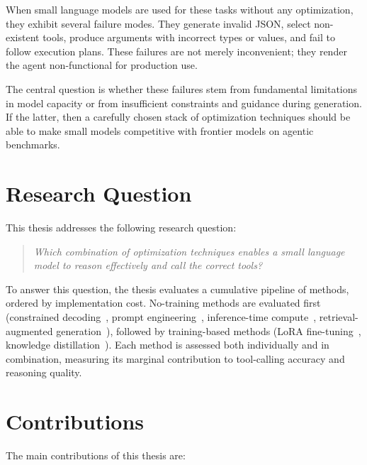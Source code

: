 When small language models are used for these tasks without any optimization, they exhibit several failure modes. They generate invalid JSON, select non-existent tools, produce arguments with incorrect types or values, and fail to follow execution plans. These failures are not merely inconvenient; they render the agent non-functional for production use.

The central question is whether these failures stem from fundamental limitations in model capacity or from insufficient constraints and guidance during generation. If the latter, then a carefully chosen stack of optimization techniques should be able to make small models competitive with frontier models on agentic benchmarks.

\section{Research Question}

This thesis addresses the following research question:

\begin{quote}
\textit{Which combination of optimization techniques enables a small language model to reason effectively and call the correct tools?}
\end{quote}

To answer this question, the thesis evaluates a cumulative pipeline of methods, ordered by implementation cost. No-training methods are evaluated first (constrained decoding~\cite{willard2023efficient}, prompt engineering~\cite{brown2020language}, inference-time compute~\cite{wei2022chain}, retrieval-augmented generation~\cite{lewis2020retrieval}), followed by training-based methods (LoRA fine-tuning~\cite{hu2022lora}, knowledge distillation~\cite{hinton2015distilling}). Each method is assessed both individually and in combination, measuring its marginal contribution to tool-calling accuracy and reasoning quality.

\section{Contributions}

The main contributions of this thesis are:

